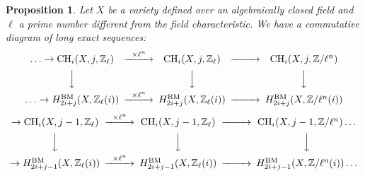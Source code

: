 \documentclass{amsart}
\newtheorem{prop}[theorem]{Proposition}
\theoremstyle{definition}
\theoremstyle{remark}
\newcommand{\mbb}{\mathbb}
\newcommand{\ZZ}{\mbb{Z}}
\begin{document}
\begin{prop}\label{prop:bockstein}
    Let $X$ be a variety defined over an algebraically closed field and $\ell$ a prime number different from the field characteristic. We have a commutative diagram of long exact sequences:
    \[
    \begin{CD}
        \ldots \to \text{CH}_i(X, j, \ZZ_\ell) @>\times \ell^n>> \text{CH}_i(X, j, \ZZ_\ell) @>>> \text{CH}_i(X, j, \ZZ/\ell^n) \\
         @VVV @VVV @VVV  \\
        \ldots \to H_{2i+j}^{\text{BM}}(X, \ZZ_\ell(i)) @>\times \ell^n >> H_{2i+j}^{\text{BM}}(X, \ZZ_\ell(i)) @>>> H_{2i+j}^{\text{BM}}(X, \ZZ/\ell^n(i)) 
    \end{CD}
    \]
    \[
    \begin{CD}
        \to {\text{CH}}_i(X, j-1, \ZZ_\ell) @>\times \ell^n >> \text{CH}_i(X, j-1, \ZZ_\ell) @>>> \text{CH}_i(X, j-1, \ZZ/\ell^n)\ldots \\
         @VVV @VVV @VVV  \\
        \to H_{2i+j-1}^{\text{BM}}(X, \ZZ_\ell(i)) @>\times \ell^n >> H_{2i+j-1}^{\text{BM}}(X, \ZZ_\ell(i)) @>>> H_{2i+j-1}^{\text{BM}}(X, \ZZ/\ell^n(i))\ldots
    \end{CD}
    \]
\end{prop}
\end{document}
